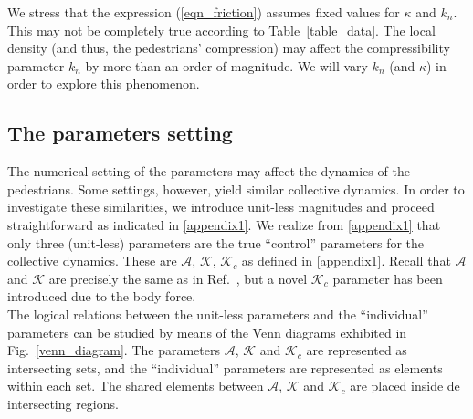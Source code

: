 \documentclass[preprint,12pt]{elsarticle}
\begin{document}
We stress that the expression (\ref{eqn_friction}) assumes fixed values for 
$\kappa$ and $k_n$. This may not be completely true according to 
Table~\ref{table_data}. The local density (and thus, the pedestrians' 
compression) may affect the compressibility parameter $k_n$ by more than an order 
of magnitude. We will vary $k_n$ (and $\kappa$) in order to explore this 
phenomenon. \\  


\subsection{\label{parameters}The parameters setting}

The numerical setting of the parameters may affect the dynamics of the 
pedestrians. Some settings, however, yield similar collective dynamics. In 
order to investigate these similarities, we introduce unit-less magnitudes 
and proceed straightforward as indicated in \ref{appendix1}. We realize from 
\ref{appendix1} that only three (unit-less) parameters  are the true 
``control'' parameters for the collective dynamics. These are $\mathcal{A}$, 
$\mathcal{K}$, $\mathcal{K}_c$ as defined in \ref{appendix1}. Recall that 
$\mathcal{A}$ and $\mathcal{K}$ are precisely the same as in 
Ref.~\cite{dorso_2019}, but a novel $\mathcal{K}_c$ parameter has been 
introduced due to the body force.   \\

The logical relations between the unit-less parameters and the ``individual'' 
parameters can be studied by means of the Venn diagrams exhibited in 
Fig.~\ref{venn_diagram}. The parameters $\mathcal{A}$, $\mathcal{K}$ and 
$\mathcal{K}_c$ are represented as intersecting sets, and the ``individual'' 
parameters are represented as elements within each set. The shared elements 
between $\mathcal{A}$, $\mathcal{K}$ and $\mathcal{K}_c$ are placed inside de 
intersecting regions. \\
\end{document}
